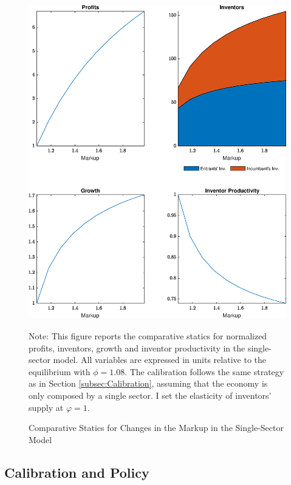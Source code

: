 \begin{figure}[th]
\begin{centering}
\caption{Comparative Statics for Changes in the Markup in the Single-Sector
Model \label{fig:OneSecCS}}
\includegraphics[width=1\textwidth]{graphs/Single_sector}
\par\end{centering}
\raggedright{}{\small{}Note: This figure reports the comparative statics
for normalized profits, inventors, growth and inventor productivity
in the single-sector model. All variables are expressed in units relative
to the equilibrium with $\phi=1.08.$ The calibration follows the
same strategy as in Section \ref{subsec:Calibration}, assuming that
the economy is only composed by a single sector. I set the elasticity
of inventors' supply at $\varphi=1$. }{\small\par}
\end{figure}
\FloatBarrier

\subsection{Calibration and Policy\label{subsec:Two-sectors}}


